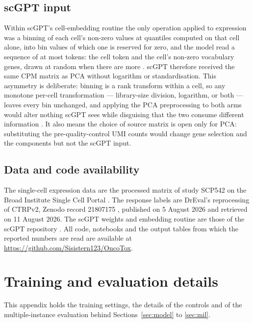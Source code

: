 \section{scGPT input}
\label{app:scgpt-input}

Within scGPT's cell-embedding routine the only operation applied to expression was a binning of each
cell's non-zero values at quantiles computed on that cell alone, into \CfgBins{} bin values of which one
is reserved for zero, and the model read a sequence of at most \CfgMaxGenes{} tokens: the cell token and
the cell's non-zero vocabulary genes, drawn at random when there are more \cite{scgpt,scgpt_code}. scGPT
therefore received the same CPM matrix as PCA without logarithm or standardisation. This asymmetry is
deliberate: binning is a rank transform within a cell, so any monotone per-cell transformation ---
library-size division, logarithm, or both --- leaves every bin unchanged, and applying the PCA
preprocessing to both arms would alter nothing scGPT sees while disguising that the two consume
different information \cite{scgpt}. It also means the choice of source matrix is open only for PCA:
substituting the pre-quality-control UMI counts would change gene selection and the components but not
the scGPT input.

\section{Data and code availability}
\label{sec:availability}

The single-cell expression data are the processed matrix of study SCP542 on the Broad Institute Single
Cell Portal \cite{scp542_portal}. The response labels are DrEval's reprocessing of CTRPv2, Zenodo record
21807175 \cite{dreval_data}, published on 5 August 2026 and retrieved on 11 August 2026. The scGPT
weights and embedding routine are those of the scGPT repository \cite{scgpt_code}. All code, notebooks
and the output tables from which the reported numbers are read are available at
\url{https://github.com/Sisistern123/OncoTox}.

\chapter{Training and evaluation details}
\label{app:training-eval}

This appendix holds the training settings, the details of the controls and of the multiple-instance
evaluation behind Sections~\ref{sec:model} to \ref{sec:mil}.

